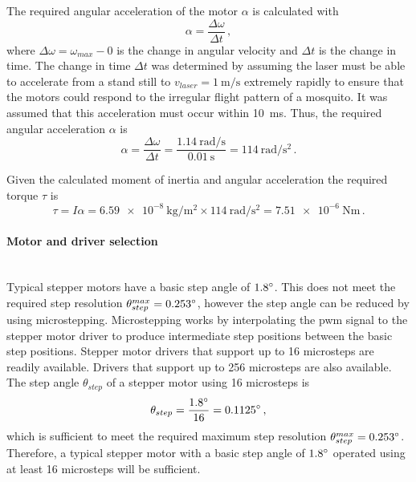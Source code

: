 The required angular acceleration of the motor $\alpha$ is calculated with
\begin{equation}
    \alpha = \frac{\Delta\omega}{\Delta t}\,,
\end{equation}
where $\Delta\omega = \omega_{max} - 0$ is the change in angular velocity and $\Delta t$ is the change in time. The change in time $\Delta t$ was determined by assuming the laser must be able to accelerate from a stand still to $v_{laser} = \SI{1}{\meter\per\second}$ extremely rapidly to ensure that the motors could respond to the irregular flight pattern of a mosquito. It was assumed that this acceleration must occur within 10~ms. Thus, the required angular acceleration $\alpha$ is
\begin{equation}
    \alpha = \frac{\Delta\omega}{\Delta t} = \frac{\SI{1.14}{\radian\per\second}}{\SI{0.01}{\second}} = \SI{114}{\radian\per\second\squared}\,.
\end{equation}

Given the calculated moment of inertia and angular acceleration the required torque $\tau$ is
\begin{equation}
    \tau = I\alpha = \SI{6.59e-8}{\kg\per\meter\squared} \times \SI{114}{\radian\per\second\squared} = \SI{7.51e-6}{\newton\meter}\,.
\end{equation}


\paragraph{Motor and driver selection}\hfill\\
Typical stepper motors have a basic step angle of $1.8^{\circ}$. This does not meet the required step resolution $\theta_{step}^{max} = 0.253^{\circ}$, however the step angle can be reduced by using microstepping. Microstepping works by interpolating the \gls{pwm} signal to the stepper motor driver to produce intermediate step positions between the basic step positions. Stepper motor drivers that support up to 16 microsteps are readily available. Drivers that support up to 256 microsteps are also available. The step angle $\theta_{step}$ of a stepper motor using 16 microsteps is
\begin{equation}
    \theta_{step} = \frac{1.8^{\circ}}{16} = 0.1125^{\circ}\,,
\end{equation}
which is sufficient to meet the required maximum step resolution $\theta_{step}^{max} = 0.253^{\circ}$. Therefore, a typical stepper motor with a basic step angle of $1.8^{\circ}$ operated using at least 16 microsteps will be sufficient.

